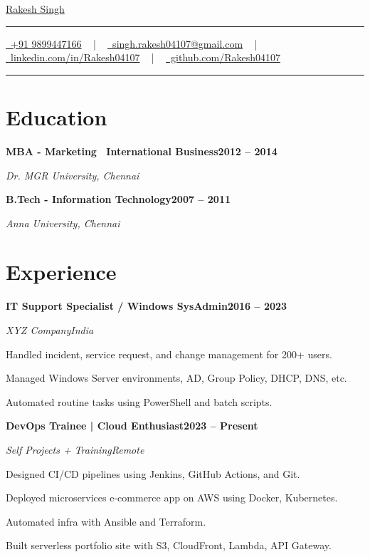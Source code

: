 \documentclass[letterpaper,10pt]{article}
\newcommand{\documentTitle}[2]{
\begin{center}
{\Huge\color{accentTitle} #1}
\vspace{10pt}
{\color{accentLine} \hrule}
\vspace{2pt}
\footnotesize{#2}
\vspace{2pt}
{\color{accentLine} \hrule}
\end{center}
}
\newcommand{\heading}[2]{
\hspace{10pt}#1\hfill#2\
}
\newcommand{\headingBf}[2]{
\heading{\textbf{#1}}{\textbf{#2}}
}
\newcommand{\headingIt}[2]{
\heading{\textit{#1}}{\textit{#2}}
}
\newenvironment{resume_list}{
\vspace{-7pt}
\begin{itemize}[itemsep=-2px, parsep=1pt, leftmargin=30pt]
}{
\end{itemize}
}
\begin{document}
\documentTitle{\href{https://rakeshinfo.xyz}{Rakesh Singh}}{
\href{tel:+919899447166}{\raisebox{-0.15\height} \faMobile\ +91 9899447166} ~ | ~
\href{mailto:singh.rakesh04107@gmail.com}{\raisebox{-0.15\height} \faEnvelope\ singh.rakesh04107@gmail.com} ~ | ~
\href{https://linkedin.com/in/Rakesh04107}{\raisebox{-0.15\height} \faLinkedin\ linkedin.com/in/Rakesh04107} ~ | ~
\href{https://github.com/Rakesh04107}{\raisebox{-0.15\height} \faGithub\ github.com/Rakesh04107}
}

\section{Education}
\headingBf{MBA - Marketing \ International Business}{2012 -- 2014}
\headingIt{Dr. MGR University, Chennai}{}
\headingBf{B.Tech - Information Technology}{2007 -- 2011}
\headingIt{Anna University, Chennai}{}

\section{Experience}
\headingBf{IT Support Specialist / Windows SysAdmin}{2016 -- 2023}
\headingIt{XYZ Company}{India}
\begin{resume_list}
\item Handled incident, service request, and change management for 200+ users.
\item Managed Windows Server environments, AD, Group Policy, DHCP, DNS, etc.
\item Automated routine tasks using PowerShell and batch scripts.
\end{resume_list}

\headingBf{DevOps Trainee | Cloud Enthusiast}{2023 -- Present}
\headingIt{Self Projects + Training}{Remote}
\begin{resume_list}
\item Designed CI/CD pipelines using Jenkins, GitHub Actions, and Git.
\item Deployed microservices e-commerce app on AWS using Docker, Kubernetes.
\item Automated infra with Ansible and Terraform.
\item Built serverless portfolio site with S3, CloudFront, Lambda, API Gateway.
\end{resume_list}
\end{document}
